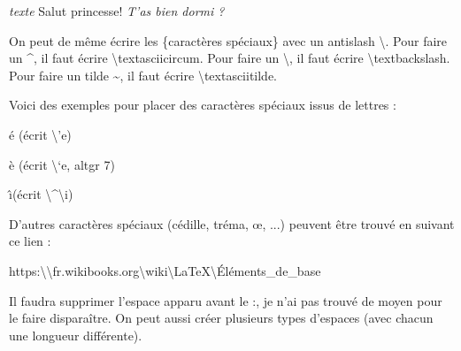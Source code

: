 \documentclass[a4paper, 12pt]{article}
\begin{document}
\emph{texte} %
Salut princesse!
{\em T'as bien dormi ?} %


On peut de même écrire les \{caractères spéciaux\} avec un antislash \textbackslash.
Pour faire un \textasciicircum, il faut écrire \textbackslash textasciicircum.
Pour faire un \textbackslash, il faut écrire \textbackslash textbackslash.
Pour faire un tilde \textasciitilde, il faut écrire \textbackslash textasciitilde.

Voici des exemples pour placer des caractères spéciaux issus de lettres : 

\'e (\'ecrit \textbackslash 'e)

\`e (\'ecrit \textbackslash `e, altgr 7)

\^\i  (\'ecrit \textbackslash  \^{}\textbackslash  i) %

D'autres caractères spéciaux (cédille, tréma, \oe , ...) peuvent être trouvé en suivant ce lien :

https:\textbackslash\textbackslash fr.wikibooks.org\textbackslash wiki\textbackslash LaTeX\textbackslash \'Eléments\_de\_base

Il faudra supprimer l'espace apparu avant le :, je n'ai pas trouvé de moyen pour le faire disparaître.
On peut aussi créer plusieurs types d'espaces (avec chacun une longueur différente).
\end{document}
